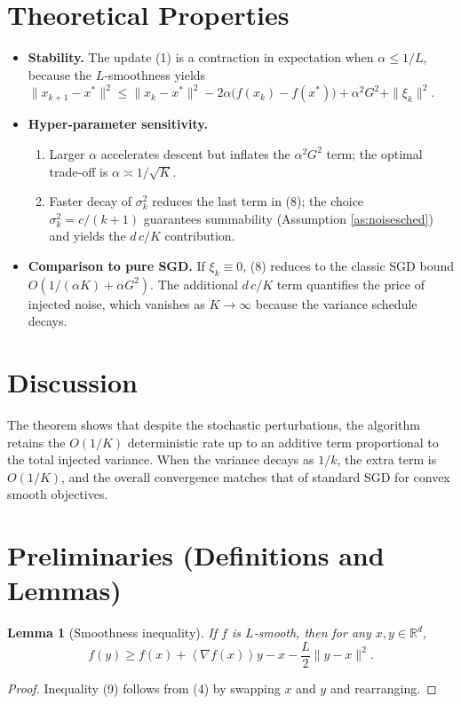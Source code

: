 \documentclass{article}
\newtheorem{lemma}{Lemma}
\newcommand{\RR}{\mathbb{R}}
\newcommand{\inner}[1]{\left\langle#1\right\rangle}
\begin{document}
\section*{Theoretical Properties}
\begin{itemize}
\item \textbf{Stability.} The update (1) is a contraction in expectation
when $\alpha\le 1/L$, because the $L$‑smoothness yields
$\|x_{k+1}-x^{*}\|^{2}\le\|x_{k}-x^{*}\|^{2}
-2\alpha\bigl(f(x_{k})-f(x^{*})\bigr)+\alpha^{2}G^{2}+ \|\xi_{k}\|^{2}$.
\item \textbf{Hyper‑parameter sensitivity.}
\begin{enumerate}
\item Larger $\alpha$ accelerates descent but inflates the $\alpha^{2}G^{2}$
term; the optimal trade‑off is $\alpha\asymp 1/\sqrt{K}$.
\item Faster decay of $\sigma_{k}^{2}$ reduces the last term in (8); the
choice $\sigma_{k}^{2}=c/(k+1)$ guarantees summability (Assumption
\ref{as:noisesched}) and yields the $d\,c/K$ contribution.
\end{enumerate}
\item \textbf{Comparison to pure SGD.}
If $\xi_{k}\equiv0$, (8) reduces to the classic SGD bound
$O(1/(\alpha K)+\alpha G^{2})$.
The additional $d\,c/K$ term quantifies the price of injected noise,
which vanishes as $K\to\infty$ because the variance schedule decays.
\end{itemize}

\section*{Discussion}
The theorem shows that despite the stochastic perturbations,
the algorithm retains the $O(1/K)$ deterministic rate up to an
additive term proportional to the total injected variance.
When the variance decays as $1/k$, the extra term is $O(1/K)$, and the
overall convergence matches that of standard SGD for convex smooth
objectives.

\newpage
\section*{Preliminaries (Definitions and Lemmas)}
\begin{lemma}[Smoothness inequality]\label{lem:smooth}
If $f$ is $L$‑smooth, then for any $x,y\in\RR^{d}$,
\[
f(y)\ge f(x)+\inner{\nabla f(x)}{y-x}-\frac{L}{2}\|y-x\|^{2}.
\tag{9}
\]
\end{lemma}
\begin{proof}
Inequality (9) follows from (4) by swapping $x$ and $y$ and rearranging.
\end{proof}
\end{document}
